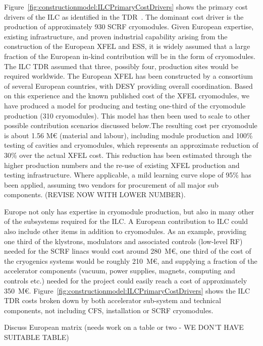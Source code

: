 \documentclass[%
 reprint,
 amsmath,amssymb,
 aps,
]{revtex4-1}
\begin{document}
Figure~\ref{fig:constructionmodel:ILCPrimaryCostDrivers} shows the primary cost drivers of the ILC as identified in the TDR~\cite{Adolphsen:2013kya}. The dominant cost driver is the production of approximately 930 SCRF cryomodules. Given European expertise, 
existing infrastructure, and proven industrial capability arising from the construction 
of the European XFEL and ESS, it is widely assumed that a large fraction of the European in-kind contribution  
will be in the form of cryomodules. The ILC TDR assumed that three, possibly four, production sites 
would be required worldwide.  
The European XFEL has been constructed by a consortium of several European countries, with DESY providing overall coordination.  Based on this experience and the known published cost  of the XFEL cryomodules, we have produced a model for producing and testing one-third of the cryomodule production (310 cryomodules). This model has then been used to scale to other possible contribution scenarios discussed below.The resulting cost per cryomodule is about 1.56 M\euro{} (material and labour), including module production and 100\% testing of cavities and cryomodules, which represents an approximate reduction of 30\% over the actual XFEL cost.  This reduction has been estimated through the higher production numbers and the re-use of existing XFEL production and testing infrastructure.  Where applicable, a mild learning curve slope of 95\% has been applied, assuming two vendors for procurement of all major sub components. (REVISE NOW WITH LOWER NUMBER).

Europe not only has expertise in cryomodule production, but also in many other 
of the subsystems required for the ILC. A European contribution to ILC could 
also include other items in addition to cryomodules. As an example, providing 
one third of the klystrons, modulators and associated controls (low-level RF) 
needed for the SCRF linacs would cost around 280~M\euro{}, one third of the cost of 
the cryogenics systems would be roughly 210~M\euro{}, and supplying a fraction of the 
accelerator components (vacuum, power supplies, magnets, computing and controls 
etc.) needed for the project could easily reach a cost of approximately 350~M\euro{}. 
Figure~\ref{fig:constructionmodel:ILCPrimaryCostDrivers} shows the ILC TDR costs broken down by both accelerator sub-system and 
technical components, not including CFS, installation or SCRF cryomodules.

Discuss European matrix (needs work on a table or two - WE DON'T HAVE SUITABLE TABLE) 
\end{document}
